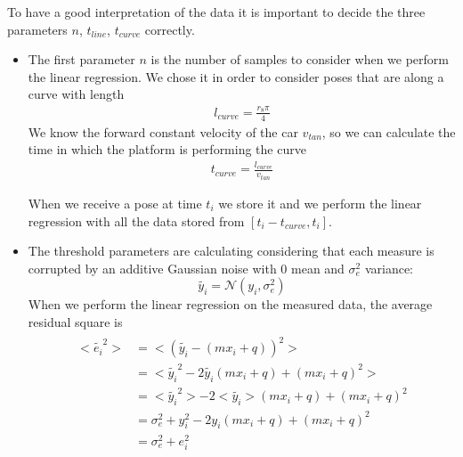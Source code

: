 To have a good interpretation of the data it is important to decide the three parameters $n$, $t_{line}$, $t_{curve}$ correctly.\\
\begin{itemize}
\item The first parameter $n$ is the number of samples to consider when we perform the linear regression. We chose it in order to consider poses that are along a curve with length 
\begin{align}
l_{curve} = \frac{r_{8}\pi}{4} \label{eq:lengthcurve} 
\end{align}
We know the forward constant velocity of the car $v_{tan}$, so we can calculate the time in which the platform is performing the curve 
\begin{align}
t_{curve} = \frac{l_{curve}}{v_{tan}} \label{eq:timecurve} 
\end{align}

When we receive a pose at time $t_i$ we store it and we perform the linear regression with all the data stored from $[t_i-t_{curve},t_i]$.
\item The threshold parameters are calculating considering that each measure is corrupted by an additive Gaussian noise with 0 mean and $\sigma_e^2$ variance: $$\tilde{y_i} = \mathcal{N}(y_i,\sigma_e^2) $$
When we perform the linear regression on the measured data, the average residual square is 
\begin{align}
\begin{split}
<\tilde{e_i}^2> &= <(\tilde{y_i} - (mx_i + q))^2>  \\
&= <\tilde{y_i}^2 - 2\tilde{y_i}(mx_i + q) + (mx_i + q)^2>  \\
&= <\tilde{y_i}^2> - 2<\tilde{y_i}>(mx_i + q) + (mx_i + q)^2 \\
&=  \sigma_e^2 + y_i^2  - 2y_i(mx_i + q) + (mx_i + q)^2  \\
&=  \sigma_e^2 + e_i^2 
\end{split}
\end{align}


\end{itemize}
